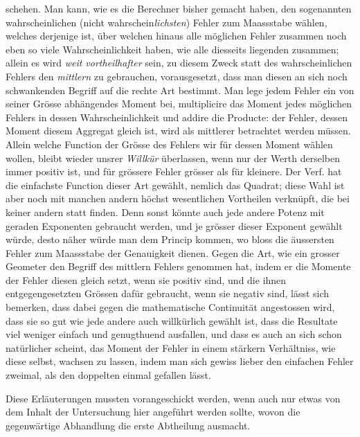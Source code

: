 %
schehen. Man kann, wie es die Berechner bisher gemacht haben, den sogenannten wahrscheinlichen (nicht wahrschein\textit{lichsten}) Fehler zum Maassstabe wählen, welches derjenige ist, über welchen hinaus alle möglichen Fehler zusammen noch eben so viele Wahrscheinlichkeit haben, wie alle diesseits liegenden zusammen; allein es wird \textit{weit vortheilhafter} sein, zu diesem Zweck statt des wahrscheinlichen Fehlers den \textit{mittlern} zu gebrauchen, vorausgesetzt, dass man diesen an sich noch schwankenden Begriff auf die rechte Art bestimmt. Man lege jedem Fehler ein von seiner Grösse abhängendes Moment bei, multiplicire das Moment jedes möglichen Fehlers in dessen Wahrscheinlichkeit und addire die Producte: der Fehler, dessen Moment diesem Aggregat gleich ist, wird als mittlerer betrachtet werden müssen. Allein welche Function der Grösse des Fehlers wir für dessen Moment wählen wollen, bleibt wieder unsrer \textit{Willkür} überlassen, wenn nur der Werth derselben immer positiv ist, und für grössere Fehler grösser als für kleinere. Der Verf. hat die einfachste Function dieser Art gewählt, nemlich das Quadrat; diese Wahl ist aber noch mit manchen andern höchst wesentlichen Vortheilen verknüpft, die bei keiner andern statt finden. Denn sonst könnte auch jede andere Potenz mit geraden Exponenten gebraucht werden, und je grösser dieser Exponent gewählt würde, desto näher würde man dem Princip kommen, wo bloss die äussersten Fehler zum Maassstabe der Genauigkeit dienen. Gegen die Art, wie ein grosser Geometer den Begriff des mittlern Fehlers genommen hat, indem er die Momente der Fehler diesen gleich setzt, wenn sie positiv sind, und die ihnen entgegengesetzten Grössen dafür gebraucht, wenn sie negativ sind, lässt sich bemerken, dass dabei gegen die mathematische Continuität angestossen wird, dass sie so gut wie jede andere auch willkürlich gewählt ist, dass die Resultate viel weniger einfach und genugthuend ausfallen, und dass es auch an sich schon natürlicher scheint, das Moment der Fehler in einem stärkern Verhältniss, wie diese selbst, wachsen zu lassen, indem man sich gewiss lieber den einfachen Fehler zweimal, als den doppelten einmal gefallen lässt.

Diese Erläuterungen mussten vorangeschickt werden, wenn auch nur etwas von dem Inhalt der Untersuchung hier angeführt werden sollte, wovon die gegenwärtige Abhandlung die erste Abtheilung ausmacht.


